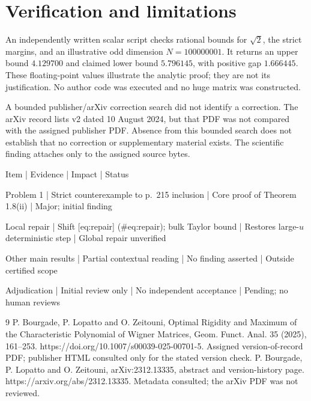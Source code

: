 \documentclass[10pt]{article}
\begin{document}
\section*{Verification and limitations}
An independently written scalar script checks rational bounds for \(\sqrt2\), the strict margins, and an illustrative odd dimension \(N=100000001\). It returns an upper bound \(4.129700\) and claimed lower bound \(5.796145\), with positive gap \(1.666445\). These floating-point values illustrate the analytic proof; they are not its justification. No author code was executed and no huge matrix was constructed.\par
A bounded publisher/arXiv correction search did not identify a correction. The arXiv record lists v2 dated 10 August 2024, but that PDF was not compared with the assigned publisher PDF. Absence from this bounded search does not establish that no correction or supplementary material exists. The scientific finding attaches only to the assigned source bytes.\par
Item | Evidence | Impact | Status\par
Problem 1 | Strict counterexample to p. 215 inclusion | Core proof of Theorem 1.8(ii) | Major; initial finding\par
Local repair | Shift [eq:repair] (\#eq:repair); bulk Taylor bound | Restores large-\(u\) deterministic step | Global repair unverified\par
Other main results | Partial contextual reading | No finding asserted | Outside certified scope\par
Adjudication | Initial review only | No independent acceptance | Pending; no human reviews\par
9 P. Bourgade, P. Lopatto and O. Zeitouni, Optimal Rigidity and Maximum of the Characteristic Polynomial of Wigner Matrices, Geom. Funct. Anal. 35 (2025), 161–253. https://doi.org/10.1007/s00039-025-00701-5. Assigned version-of-record PDF; publisher HTML consulted only for the stated version check. P. Bourgade, P. Lopatto and O. Zeitouni, arXiv:2312.13335, abstract and version-history page. https://arxiv.org/abs/2312.13335. Metadata consulted; the arXiv PDF was not reviewed.\par
\end{document}
